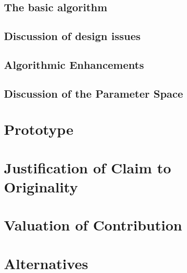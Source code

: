 \subsection{The basic algorithm}

\subsection{Discussion of design issues}


\subsection{Algorithmic Enhancements}


\subsection{Discussion of the Parameter Space}


\section{Prototype}

\section{Justification of Claim to Originality}

\section{Valuation of Contribution}

\section{Alternatives}
